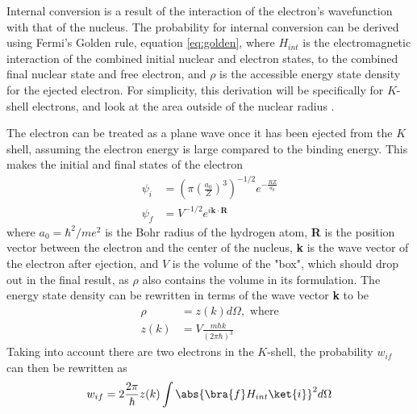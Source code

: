 Internal conversion is a result of the interaction of the electron's wavefunction with that of the nucleus. The probability for internal conversion can be derived using Fermi's Golden rule, equation \ref{eq:golden}, where $H_{int}$ is the electromagnetic interaction of the combined initial nuclear and electron states, to the combined final nuclear state and free electron, and $\rho$ is the accessible energy state density for the ejected electron. For simplicity, this derivation will be specifically for $K$-shell electrons, and look at the area outside of the nuclear radius \citep{roy67:_e0, blatt79:_emradiation, segre77:_icradiation}.

The electron can be treated as a plane wave once it has been ejected from the $K$ shell, assuming the electron energy is large compared to the binding energy. This makes the initial and final states of the electron
\begin{subequations}
\begin{align}
    \psi_{i} & = \left(\pi\left(\frac{a_0}{Z}\right)^3\right)^{-1/2}e^{-\frac{RZ}{a_0}}\\
    \psi_{f} & = V^{-1/2}e^{i\textbf{k}\cdot\textbf{R}}
\end{align}
\end{subequations}
where $a_0=\hbar^2/me^2$ is the Bohr radius of the hydrogen atom, \textbf{R} is the position vector between the electron and the center of the nucleus, \textbf{k} is the wave vector of the electron after ejection, and $V$ is the volume of the "box", which should drop out in the final result, as $\rho$ also contains the volume in its formulation. The energy state density can be rewritten in terms of the wave vector \textbf{k} to be 
\begin{align}
    \rho & = z(k)d\Omega, \text{ where} \\
    z(k) & = V\frac{m\hbar k}{(2\pi\hbar)^3}
\end{align}
Taking into account there are two electrons in the $K$-shell, the probability $w_{if}$ can then be rewritten as
\begin{equation}
\label{eq:golden_ic}
    w_{if}=2 \frac{2\pi}{\hbar}z(k)\int\abs{\bra{f}H_{int}\ket{i}}^2d\Omega
\end{equation}

